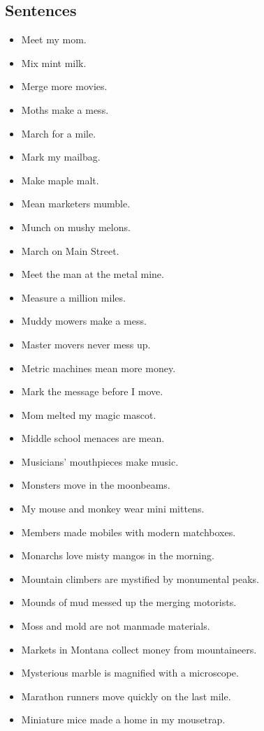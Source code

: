 \documentclass{article}
\begin{document}
\subsection*{Sentences}
\begin{itemize}
    \item Meet my mom.
    \item Mix mint milk.
    \item Merge more movies.
    \item Moths make a mess.
    \item March for a mile.
    \item Mark my mailbag.
    \item Make maple malt.
    \item Mean marketers mumble.
    \item Munch on mushy melons.
    \item March on Main Street.
    \item Meet the man at the metal mine.
    \item Measure a million miles.
    \item Muddy mowers make a mess.
    \item Master movers never mess up.
    \item Metric machines mean more money.
    \item Mark the message before I move.
    \item Mom melted my magic mascot.
    \item Middle school menaces are mean.
    \item Musicians' mouthpieces make music.
    \item Monsters move in the moonbeams.
    \item My mouse and monkey wear mini mittens.
    \item Members made mobiles with modern matchboxes.
    \item Monarchs love misty mangos in the morning.
    \item Mountain climbers are mystified by monumental peaks.
    \item Mounds of mud messed up the merging motorists.
    \item Moss and mold are not manmade materials.
    \item Markets in Montana collect money from mountaineers.
    \item Mysterious marble is magnified with a microscope.
    \item Marathon runners move quickly on the last mile.
    \item Miniature mice made a home in my mousetrap.
\end{itemize}
\end{document}
